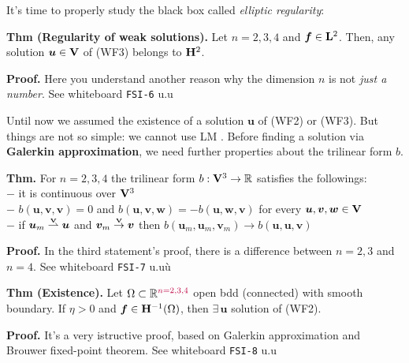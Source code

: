 \medskip

It's time to properly study the black box called \emph{elliptic regularity}:

\textbf{Thm (Regularity of weak solutions).} Let $n=2,3,4$ and $\bm f\in\mathbf{L}^2$. Then, any solution $\bm u\in\mathbf{V}$ of (WF3) belongs to $\mathbf{H}^2$.

\textbf{\color{lavender(floral)}Proof.} {\color{purple} Here you understand another reason why the dimension $n$ is not \emph{just a number}. } See whiteboard \texttt{FSI-6} u.u

\noindent\rlap{\rule[1.5ex]{0.495\textwidth}{.2pt}}\vspace{-0.3em}


Until now we assumed the existence of a solution $\bm u$ of (WF2) or (WF3). But things are not so simple: we cannot use LM \Sadey. Before finding a solution via \textbf{Galerkin approximation}, we need further properties about the trilinear form $b$.

\smallskip

\textbf{Thm.} {\color{purple} For $n=2,3,4$} the trilinear form $b:\mathbf{V}^3\to\mathbb{R}$ satisfies the followings: \\
$-$ it is continuous over $\mathbf{V}^3$ \\
$-$ $b(\bm u,\bm v,\bm v)=0$ and $b(\bm u,\bm v,\bm w)=-b(\bm u,\bm w,\bm v)$ for every $\bm u,\bm v,\bm w \in \mathbf{V}$ \\
$-$ if $\bm u_m \overset{\scriptscriptstyle\mathbf{V}}{\rightharpoonup}\bm u$ and $\bm v_m \overset{\scriptscriptstyle\mathbf{V}}{\rightarrow}\bm v$ then $b(\bm u_m, \bm u_m, \bm v_m)\rightarrow b(\bm u,\bm u,\bm v)$ 

\textbf{\color{lavender(floral)}Proof.} {\color{purple} In the third statement's proof, there is a difference between $n=2,3$ and $n=4$.} See whiteboard \texttt{FSI-7} u.uù

\smallskip

\textbf{Thm (Existence).} Let $\Omega\subset\mathbb{R}^{\color{purple}n=2,3,4}$ open bdd (connected) with smooth boundary. If $\eta>0$ and $\bm f \in \mathbf{H}^{-1}(\Omega)$, then $\exists\,\bm u$ solution of (WF2).

\textbf{\color{lavender(floral)}Proof.} It's a very istructive proof, based on Galerkin approximation and Brouwer fixed-point theorem. See whiteboard \texttt{FSI-8} u.u

\noindent\rlap{\rule[1.5ex]{0.495\textwidth}{.2pt}}\vspace{-0.3em}

